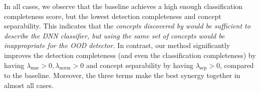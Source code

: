 In all cases, we observe that the baseline achieves a high enough classification completeness score, but the lowest detection completeness and concept separability.
This indicates that the {\em concepts discovered by \citep{yeh2020completeness} would be sufficient to describe the DNN classifier, but using the same set of concepts would be inappropriate for the OOD detector.}
%
%
In contrast, our method significantly improves the detection completeness (and even the classification completeness) by having $\lambda_\textrm{mse} > 0, \lambda_\textrm{norm} > 0$ and concept separability by having $\lambda_\textrm{sep} > 0$, compared to the baseline.
Moreover, the three terms make the best synergy together in almost all cases.

